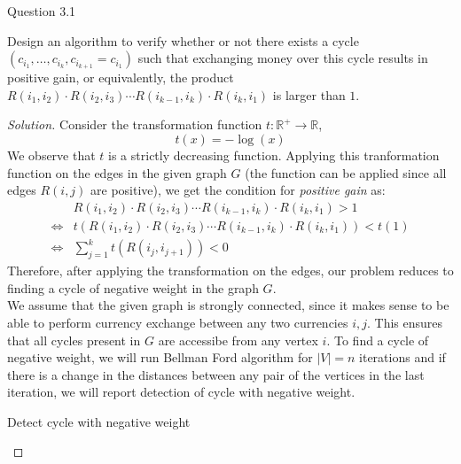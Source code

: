 \begin{solution}{Question 3.1}
    \begin{question}
        Design an algorithm to verify whether or not there exists a cycle $(c_{i_1}, \ldots, c_{i_k}, c_{i_{k+1}} = c_{i_1})$ such that exchanging money over this cycle results in positive gain, or equivalently, the product $R(i_1, i_2)\cdot R(i_2, i_3)\cdots R(i_{k-1}, i_k)\cdot R(i_k, i_1)$ is larger than $1$.
    \end{question}
    \tcblower{}
    \begin{proof}[Solution]
        Consider the transformation function $t:\mathbb{R}^{+}\to\mathbb{R}$,
        \begin{equation}
            t(x)=-\log(x)
        \end{equation}
        We observe that $t$ is a strictly decreasing function. Applying this tranformation function on the edges in the given graph $G$ (the function can be applied since all edges $R(i, j)$ are positive), we get the condition for \textit{positive gain} as:
        \begin{equation}
            \begin{split}
                &R(i_1, i_2)\cdot R(i_2, i_3)\cdots R(i_{k-1}, i_k)\cdot R(i_k, i_1) > 1\\
                \iff&t(R(i_1, i_2)\cdot R(i_2, i_3)\cdots R(i_{k-1}, i_k)\cdot R(i_k, i_1)) < t(1)\\
                \iff&\sum_{j=1}^k{t(R(i_j, i_{j+1}))} < 0
            \end{split}
        \end{equation}
        Therefore, after applying the transformation on the edges, our problem reduces to finding a cycle of negative weight in the graph $G$.\\
        We assume that the given graph is strongly connected, since it makes sense to be able to perform currency exchange between any two currencies $i, j$. This ensures that all cycles present in $G$ are accessibe from any vertex $i$. To find a cycle of negative weight, we will run Bellman Ford algorithm for $|V|=n$ iterations and if there is a change in the distances between any pair of the vertices in the last iteration, we will report detection of cycle with negative weight.\\
        \begin{algorithm}[H]
            \caption{Detect cycle with negative weight}\label{alg:cycle}
            \begin{algorithmic}[1]

\end{algorithmic}
\end{algorithm}
\end{proof}
\end{solution}
